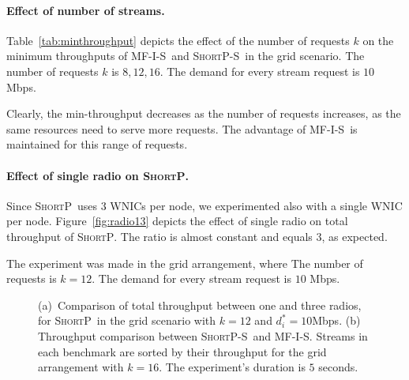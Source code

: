 \documentclass[12pt,oneside,english,a4paper]{book}
\theoremstyle{plain}
\theoremstyle{definition}
\theoremstyle{Theorem}
\theoremstyle{plain}
\newenvironment{proof sketch}[1]{\noindent {\emph{Proof sketch of #1:}}}{\hfill \qed}
\newcommand{\algA}{\textsc{MF-I-S}}
\newcommand{\algB}{\textsc{ShortP}}
\newcommand{\algBS}{\textsc{ShortP-S}}
\newcommand{\algS}{\algB}
\begin{document}
\paragraph{Effect of number of streams.}
Table~\ref{tab:minthroughput} depicts the effect of the number of
requests $k$  on the minimum throughputs of \algA\ and \algBS\ in the
grid scenario.  The number of requests $k$ is $8,12,16$. The demand
for every stream request is $10$ Mbps.

Clearly, the min-throughput decreases as the number of requests
increases, as the same resources need to serve more requests.
The advantage of \algA\ is maintained for this range of requests.


\paragraph{Effect of single radio on \algS.}
Since \algS\ uses $3$ WNICs per node, we experimented also with a single WNIC per node.
Figure~\ref{fig:radio13} depicts the effect of single radio on total throughput of \algS.
The ratio is almost constant and equals $3$, as expected.

The experiment was made in the grid arrangement, where The number of requests is $k=12$.
The demand for every stream request is $10$ Mbps.

\begin{figure}%
      \centering
          \caption{ (a)~Comparison of total throughput between one and three radios, for \algS\ in the grid
          scenario with $k=12$ and $d^*_i=10$Mbps. (b)~ Throughput comparison between \algBS\ and \algA. Streams in each benchmark are sorted by their
          throughput for the grid arrangement with $k=16$. The experiment's duration is $5$ seconds. }
     \end{figure}
\end{document}
